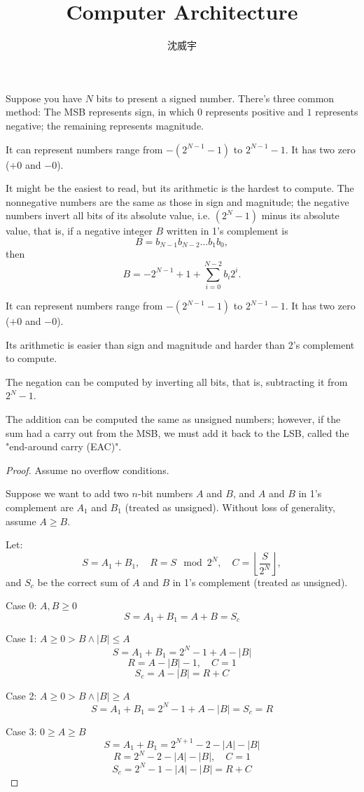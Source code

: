 \documentclass[a4paper,12pt]{report}
\begin{document}
\title{Computer Architecture}
\author{沈威宇}
\date{\temtoday}
\titletocdoc
{}


Suppose you have $N$ bits to present a signed number. There's three common method:
The MSB represents sign, in which $0$ represents positive and $1$ represents negative; the remaining represents magnitude. 

It can represent numbers range from $-(2^{N-1}-1)$ to $2^{N-1}-1$. It has two zero ($+0$ and $-0$).

It might be the easiest to read, but its arithmetic is the hardest to compute.
The nonnegative numbers are the same as those in sign and magnitude; the negative numbers invert all bits of its absolute value, i.e. $(2^N-1)$ minus its absolute value, that is, if a negative integer $B$ written in 1's complement is
\[B=b_{N-1}b_{N-2}\ldots b_1b_0,\]
then
\[B=-2^{N-1}+1+\sum_{i=0}^{N-2}b_i2^i.\]

It can represent numbers range from $-(2^{N-1}-1)$ to $2^{N-1}-1$. It has two zero ($+0$ and $-0$). 

Its arithmetic is easier than sign and magnitude and harder than 2's complement to compute. 

The negation can be computed by inverting all bits, that is, subtracting it from $2^N-1$.

The addition can be computed the same as unsigned numbers; however, if the sum had a carry out from the MSB, we must add it back to the LSB, called the "end-around carry (EAC)".
\begin{proof}
Assume no overflow conditions.

Suppose we want to add two $n$-bit numbers $A$ and $B$, and $A$ and $B$ in 1's complement are $A_1$ and $B_1$ (treated as unsigned). Without loss of generality, assume $A\geq B$.

Let:
\[S = A_1 + B_1,\quad R=S \mod 2^N, \quad C=\left\lfloor\frac{S}{2^N}\right\rfloor,\]
and $S_c$ be the correct sum of $A$ and $B$ in 1's complement (treated as unsigned).

Case 0: $A,B\geq 0$
\[S =A_1+B_1=A+B=S_c\]

Case 1: $A\geq 0>B\land |B|\leq A$
\[S =A_1+B_1=2^N-1+A-|B|\]
\[R=A-|B|-1,\quad C=1\]
\[S_c=A-|B|=R+C\]

Case 2: $A\geq 0>B\land |B|\geq A$
\[S =A_1+B_1=2^N-1+A-|B|=S_c=R\]

Case 3: $0\geq A\geq B$
\[S=A_1+B_1=2^{N+1}-2-|A|-|B|\]
\[R=2^N-2-|A|-|B|,\quad C=1\]
\[S_c=2^N-1-|A|-|B|=R+C\]
\end{proof}
\end{document}
